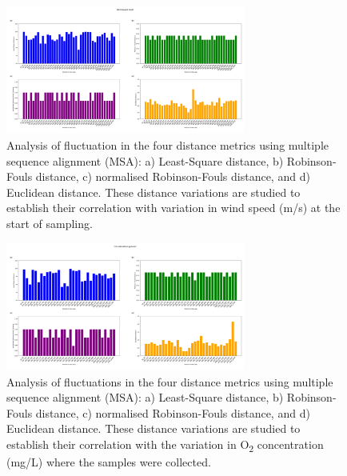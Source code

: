 \begin{figure}[]
    \centering
    \includegraphics[width=0.7\textwidth]{figure5.png}
    \caption{Analysis of fluctuation in the four distance metrics using multiple sequence alignment (MSA): a) Least-Square distance, b) Robinson-Fouls distance, c) normalised Robinson-Fouls distance, and d) Euclidean distance. These distance variations are studied to establish their correlation with variation in wind speed (m/s) at the start of sampling. \label{fig:fig6}}
\end{figure}

\begin{figure}[]
    \centering
    \includegraphics[width=0.7\textwidth]{figure6.png}
    \caption{Analysis of fluctuations in the four distance metrics using multiple sequence alignment (MSA): a) Least-Square distance, b) Robinson-Fouls distance, c) normalised Robinson-Fouls distance, and d) Euclidean distance. These distance variations are studied to establish their correlation with the variation in O\textsubscript{2} concentration (mg/L) where the samples were collected. \label{fig:fig7}}
\end{figure}

